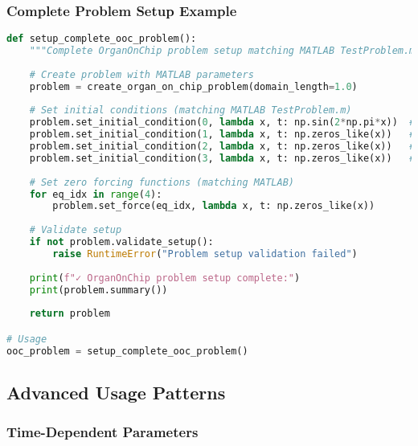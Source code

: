 \subsubsection{Complete Problem Setup Example}

\begin{lstlisting}[language=Python, caption=Complete Problem Setup]
def setup_complete_ooc_problem():
    """Complete OrganOnChip problem setup matching MATLAB TestProblem.m."""
    
    # Create problem with MATLAB parameters
    problem = create_organ_on_chip_problem(domain_length=1.0)
    
    # Set initial conditions (matching MATLAB TestProblem.m)
    problem.set_initial_condition(0, lambda x, t: np.sin(2*np.pi*x))  # u
    problem.set_initial_condition(1, lambda x, t: np.zeros_like(x))   # omega
    problem.set_initial_condition(2, lambda x, t: np.zeros_like(x))   # v  
    problem.set_initial_condition(3, lambda x, t: np.zeros_like(x))   # phi
    
    # Set zero forcing functions (matching MATLAB)
    for eq_idx in range(4):
        problem.set_force(eq_idx, lambda x, t: np.zeros_like(x))
    
    # Validate setup
    if not problem.validate_setup():
        raise RuntimeError("Problem setup validation failed")
    
    print(f"✓ OrganOnChip problem setup complete:")
    print(problem.summary())
    
    return problem

# Usage
ooc_problem = setup_complete_ooc_problem()
\end{lstlisting}

\subsection{Advanced Usage Patterns}
\label{subsec:advanced_usage}

\subsubsection{Time-Dependent Parameters}

